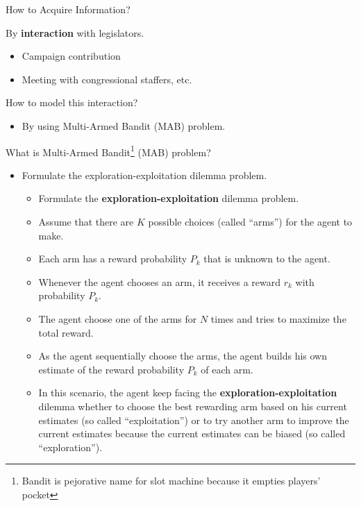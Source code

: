 \documentclass{beamer}
\begin{document}
	\begin{frame}{How to Acquire Information?}
		\begin{itemize}{
			\item By \textbf{interaction} with legislators.
				\begin{itemize}
					\item Campaign contribution
					\item Meeting with congressional staffers, etc.
				\end{itemize}
			\item How to model this interaction?
				 \begin{itemize}
					\item By using Multi-Armed Bandit (MAB) problem.
				\end{itemize}}
		\end{itemize}
	\end{frame}

	\begin{frame}{What is Multi-Armed Bandit\footnote{Bandit is pejorative name for slot machine because it empties players' pocket} (MAB) problem?}
		\begin{itemize}
			\item Formulate the exploration-exploitation dilemma problem.
			\begin{itemize}
				\item Formulate the \textbf{exploration-exploitation} dilemma problem.
				\item Assume that there are $K$ possible choices (called ``arms'') for the agent to make. 
				\item Each arm has a reward probability $P_k$ that is unknown to the agent.
				\item Whenever the agent chooses an arm, it receives a reward $r_k$ with probability $P_k$.
				\item The agent choose one of the arms for $N$ times and tries to maximize the total reward.
				\item As the agent sequentially choose the arms, the agent builds his own estimate of the reward probability $P_k$ of each arm.
				\item In this scenario, the agent keep facing the \textbf{exploration-exploitation} dilemma whether to choose the best rewarding arm based on his current estimates (so called ``exploitation'') or to try another arm to improve the current estimates because the current estimates can be biased (so called ``exploration'').
			\end{itemize}
		\end{itemize}
	\end{frame}
\end{document}

